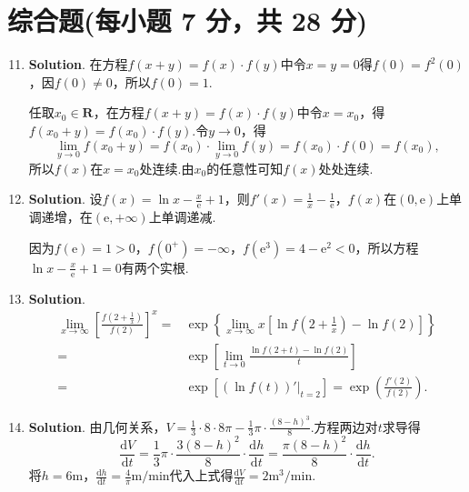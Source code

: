 \documentclass[../main.tex]{subfiles}
\begin{document}
\section{综合题(每小题 7 分，共 28 分)}
\begin{enumerate}
    \setcounter{enumi}{10}
    \item \textbf{Solution}. 在方程$f(x+y)=f(x)\cdot f(y)$中令$x=y=0$得$f(0)
              =f^{2}(0)$，因$f(0)\neq0$，所以$f(0)=1$.

          任取$x_{0}\in\mathbf{R}$，在方程$f(x+y)=f(x)\cdot f(y)$中令$x=x_{0}$，得$f(
              x_{0}+y)=f(x_{0})\cdot f(y)$.令$y\to0$，得
          \[
              \lim_{y\to0}f(x_{0}+y)=f(x_{0})\cdot\lim_{y\to0}f(y)=f(x_{0})\cdot f(0)=f
              (x_{0}),
          \]
          所以$f(x)$在$x=x_{0}$处连续.由$x_{0}$的任意性可知$f(x)$处处连续.

    \item \textbf{Solution}. 设$f(x)=\ln x-\frac{x}{\mathrm{e}}+1$，则$f'(x)
              =\frac{1}{x}-\frac{1}{\mathrm{e}}$，$f(x)$在$(0,\mathrm{e})$上单调递增，在$(
              \mathrm{e},+\infty)$上单调递减.

          因为$f(\mathrm{e})=1>0$，$f(0^{+})=-\infty$，$f(\mathrm{e}^{3})=4-\mathrm{e}
              ^{2}<0$，所以方程$\ln x-\frac{x}{\mathrm{e}}+1=0$有两个实根.

    \item \textbf{Solution}.
          \[
              \begin{aligned}
                  \lim_{x\to\infty}\left[\frac{f\left(2+\frac{1}{x}\right)}{f(2)}\right]^{x} = {} & \exp\left\{{\lim\limits_{x\to\infty}x\left[\ln f\left(2+\frac{1}{x}\right)-\ln f(2)\right]}\right\} \\
                  = {}                                                                            & \exp\left[{\lim\limits_{t\to0}\frac{\ln f(2+t)-\ln f(2)}{t}}\right]                                 \\
                  = {}                                                                            & \exp\left[{\left(\ln f(t)\right)'\Big|_{t=2}}\right]=\exp\left({\frac{f'(2)}{f(2)}}\right).
              \end{aligned}
          \]

    \item \textbf{Solution}. 由几何关系，$V=\frac{1}{3}\cdot 8 \cdot 8\pi-\frac{1}{3}
              \pi\cdot\frac{(8-h)^{3}}{8}$.方程两边对$t$求导得
          \[
              \frac{\mathrm{d}V}{\mathrm{d}t}=\frac{1}{3}\pi\cdot\frac{3(8-h)^{2}}{8}\cdot
              \frac{\mathrm{d}h}{\mathrm{d}t}=\frac{\pi(8-h)^{2}}{8}\cdot\frac{\mathrm{d}h}{\mathrm{d}t}
              .
          \]
          将$h=6\mathrm{m}$，$\frac{\mathrm{d}h}{\mathrm{d}t}=\frac{4}{\pi}\mathrm{m/min}$代入上式得$\frac{\mathrm{d}V}{\mathrm{d}t}
              =2\mathrm{m^3/min}$.
\end{enumerate}
\end{document}
